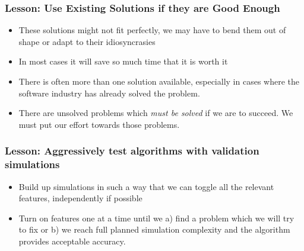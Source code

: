 \documentclass{beamer}
\begin{document}
\frame
{
    \frametitle{Lesson: Use Existing Solutions if they are Good Enough}


    \begin{itemize}

        \item These solutions might not fit perfectly, we may have to bend
            them out of shape or adapt to their idiosyncrasies

        \item In most cases it will save so much time that it is worth it

        \item There is often more than one solution available, especially in
            cases where the software industry has already solved the problem.

        \item There are unsolved problems which {\em must be solved} if we are
            to succeed.  We must put our effort towards those problems.

    \end{itemize}

}

\frame
{
    \frametitle{Lesson: Aggressively test algorithms with validation simulations}


    \begin{itemize}

        \item Build up simulations in such a way that we can toggle all the
            relevant features, independently if possible

        \item Turn on features one at a time until we a) find a problem which we
            will try to fix or b) we reach full planned simulation complexity
            and the algorithm provides acceptable accuracy.


    \end{itemize}

}
\end{document}
